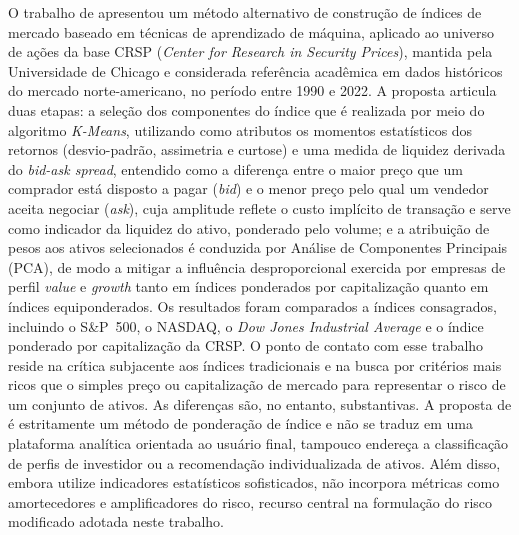 O trabalho de  apresentou um método alternativo de construção de índices de mercado baseado em técnicas de aprendizado de máquina, aplicado ao universo de ações da base CRSP (\textit{Center for Research in Security Prices}), mantida pela Universidade de Chicago e considerada referência acadêmica em dados históricos do mercado norte-americano, no período  entre 1990 e 2022. A proposta articula duas etapas: a seleção dos componentes do índice que é realizada por meio do algoritmo \textit{K-Means}, utilizando como atributos os momentos estatísticos dos retornos (desvio-padrão, assimetria e curtose) e uma medida de liquidez derivada do \textit{bid-ask spread}, entendido como a diferença entre o maior preço que um comprador está disposto a pagar (\textit{bid}) e o menor preço pelo qual um vendedor aceita negociar (\textit{ask}), cuja amplitude reflete o custo implícito de transação e serve como indicador da liquidez do ativo, ponderado pelo volume; e a atribuição de pesos aos ativos selecionados é conduzida por Análise de Componentes Principais (PCA), de modo a mitigar a influência desproporcional exercida por empresas de perfil \textit{value} e \textit{growth} tanto em índices ponderados por capitalização quanto em índices equiponderados. Os resultados foram comparados a índices consagrados, incluindo o S\&P~500, o NASDAQ, o \textit{Dow Jones Industrial Average} e o índice ponderado por capitalização da CRSP. O ponto de contato com esse trabalho reside na crítica subjacente aos índices tradicionais e na busca por critérios mais ricos que o simples preço ou capitalização de mercado para representar o risco de um conjunto de ativos. As diferenças são, no entanto, substantivas. A proposta de  é estritamente um método de ponderação de índice e não se traduz em uma plataforma analítica orientada ao usuário final, tampouco endereça a classificação de perfis de investidor ou a recomendação individualizada de ativos. Além disso, embora utilize indicadores estatísticos sofisticados, não incorpora métricas como amortecedores e amplificadores do risco, recurso central na formulação do risco modificado adotada neste trabalho.

